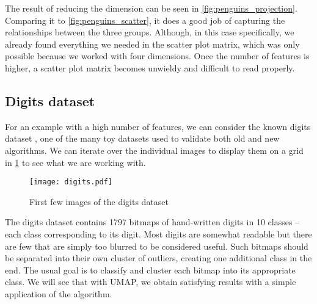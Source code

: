 The result of reducing the dimension can be seen in \ref{fig:penguins_projection}. Comparing it to \ref{fig:penguins_scatter}, it does a good job of capturing the relationships between the three groups. Although, in this case specifically, we already found everything we needed in the scatter plot matrix, which was only possible because we worked with four dimensions. Once the number of features is higher, a scatter plot matrix becomes unwieldy and difficult to read properly.

\subsection{Digits dataset}
For an example with a high number of features, we can consider the known digits dataset \cite{optical_recognition_of_handwritten_digits_80}, one of the many toy datasets used to validate both old and new algorithms. We can iterate over the individual images to display them on a grid in \ref{fig:digits} to see what we are working with.

\begin{figure}[h!]
  \centering
  \texttt{[image: digits.pdf]}
  \caption{First few images of the digits dataset}
  \label{fig:digits}
\end{figure}

The digits dataset contains 1797 bitmaps of hand-written digits in 10 classes -- each class corresponding to its digit. Most digits are somewhat readable but there are few that are simply too blurred to be considered useful. Such bitmaps should be separated into their own cluster of outliers, creating one additional class in the end.
The usual goal is to classify and cluster each bitmap into its appropriate class. We will see that with UMAP, we obtain satisfying results with a simple application of the algorithm.
